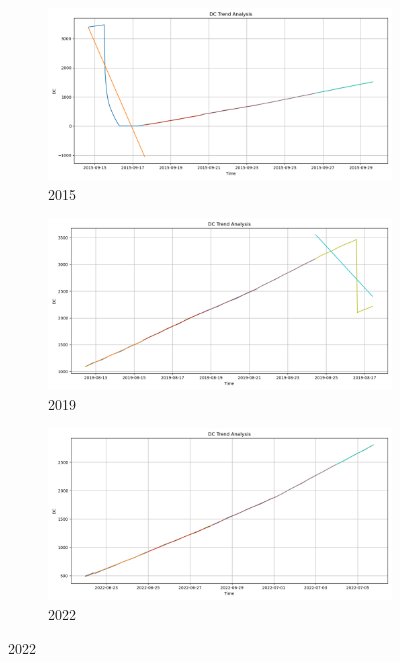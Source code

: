 \begin{figure}[h]
	\centering
	\caption{15-days DC polyfit trend}
	\begin{subfigure}{0.3\textwidth}
		\centering
		\includegraphics[width=\textwidth]{graphs/polyfit_trend_analysis/2015_15days_BLOCK3days_dc_trend_analysis.png}
		\caption{2015}
		\label{fig:2015_polyfit_DC}
	\end{subfigure}
	\hfill
	\begin{subfigure}{0.3\textwidth}
		\centering
		\includegraphics[width=\textwidth]{graphs/polyfit_trend_analysis/2019_15days_BLOCK3days_dc_trend_analysis.png}
		\caption{2019}
		\label{fig:2019_polyfit_DC}
	\end{subfigure}
	\hfill
	\begin{subfigure}{0.3\textwidth}
		\centering
		\includegraphics[width=\textwidth]{graphs/polyfit_trend_analysis/2022_15days_BLOCK3days_dc_trend_analysis.png}
		\caption{2022}
		\label{fig:2022_polyfit_DC}
	\end{subfigure}
	
	\label{fig:DC_polyfit_15}
\end{figure}

